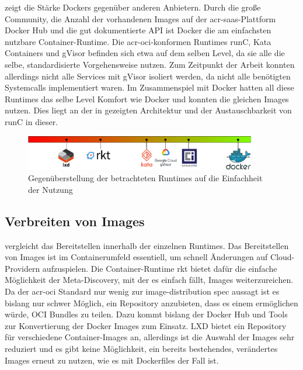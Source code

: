  zeigt die Stärke Dockers gegenüber anderen Anbietern. Durch die große Community, die Anzahl der vorhandenen Images auf der \gls{acr-saas}-Plattform Docker Hub und die gut dokumentierte API ist Docker die am einfachsten nutzbare Container-Runtime. Die \gls{acr-oci}-konformen Runtimes runC, Kata Containers und gVisor befinden sich etwa auf dem selben Level, da sie alle die selbe, standardisierte Vorgehensweise nutzen. Zum Zeitpunkt der Arbeit konnten allerdings nicht alle Services mit gVisor isoliert werden, da nicht alle benötigten Systemcalls implementiert waren. Im Zusammenspiel mit Docker hatten all diese Runtimes das selbe Level Komfort wie Docker und konnten die gleichen Images nutzen. Dies liegt an der in  gezeigten Architektur und der Austauschbarkeit von runC in dieser.

\begin{figure}[h]
	\begin{center}
		\includegraphics[width=0.9\textwidth]{bilder/rating-eou.pdf}
		\caption{Gegenüberstellung der betrachteten Runtimes auf die Einfachheit der Nutzung}
		\label{fig:compFazitEoU}
	\end{center}
\end{figure}

\subsection{Verbreiten von Images}
\label{sec:comFazitShare}

 vergleicht das Bereitstellen innerhalb der einzelnen Runtimes. Das Bereitstellen von Images ist im Containerumfeld essentiell, um schnell Änderungen auf Cloud-Providern aufzuspielen. Die Container-Runtime rkt bietet dafür die einfache Möglichkeit der Meta-Discovery, mit der es einfach fällt, Images weiterzureichen. Da der \gls{acr-oci} Standard nur wenig zur image-distribution spec aussagt ist es bislang nur schwer Möglich, ein Repository anzubieten, dass es einem ermöglichen würde, OCI Bundles zu teilen. Dazu kommt bislang der Docker Hub und Tools zur Konvertierung der Docker Images zum Einsatz. LXD bietet ein Repository für verschiedene Container-Images an, allerdings ist die Auswahl der Images sehr reduziert und es gibt keine Möglichkeit, ein bereits bestehendes, verändertes Images erneut zu nutzen, wie es mit Dockerfiles der Fall ist. 

